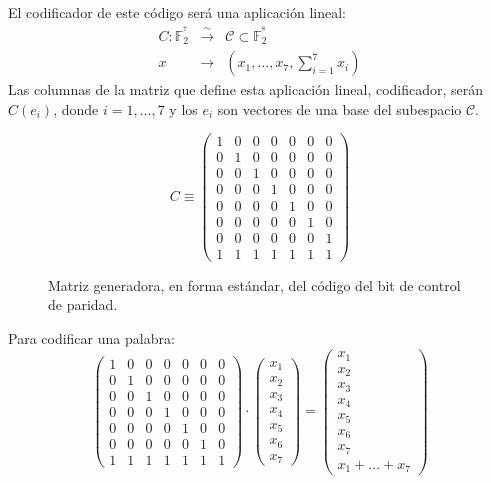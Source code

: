 El codificador de este c\'odigo ser\'a una aplicaci\'on lineal:
\begin{eqnarray*}
C:\mathbb{F}^{^7}_2&\stackrel{\sim}\longrightarrow&\mathcal{C}\subset
\mathbb{F}^{^8}_2\\
x&\longrightarrow&(x_1,\dots,x_7,\sum_{i=1}^7x_i)
\end{eqnarray*}
Las columnas de la matriz que define esta aplicaci\'on lineal, codificador,
ser\'an $C(e_i)$, donde $i=1,\dots,7$ y los $e_i$ son vectores de una 
base del subespacio $\mathcal{C}$.\\

\begin{figure}[!h]
\begin{displaymath}
C\equiv \left( \begin{array}{ccccccc}
1&0&0&0&0&0&0\\
0&1&0&0&0&0&0\\
0&0&1&0&0&0&0\\
0&0&0&1&0&0&0\\
0&0&0&0&1&0&0\\
0&0&0&0&0&1&0\\
0&0&0&0&0&0&1\\
1&1&1&1&1&1&1
\end{array} \right)
\end{displaymath}
\caption{Matriz generadora, en forma est\'andar, del c\'odigo del bit de
control de paridad.}
\end{figure}
%
Para codificar una palabra:
\begin{displaymath}
\left( \begin{array}{ccccccc}
1&0&0&0&0&0&0\\
0&1&0&0&0&0&0\\
0&0&1&0&0&0&0\\
0&0&0&1&0&0&0\\
0&0&0&0&1&0&0\\
0&0&0&0&0&1&0\\
1&1&1&1&1&1&1
\end{array} \right) \cdot
\left( \begin{array}{c}
x_1\\
x_2\\
x_3\\
x_4\\
x_5\\
x_6\\
x_7
\end{array} \right) =
\left( \begin{array}{c}
x_1\\
x_2\\
x_3\\
x_4\\
x_5\\
x_6\\
x_7\\
x_1+\dots+x_7
\end{array} \right)
\end{displaymath}


